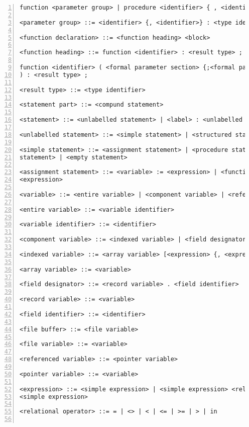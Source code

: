 \begin{Verbatim}[numbers=left]
function <parameter group> | procedure <identifier> { , <identifier>}

<parameter group> ::= <identifier> {, <identifier>} : <type identifier>

<function declaration> ::= <function heading> <block>

<function heading> ::= function <identifier> : <result type> ; |

function <identifier> ( <formal parameter section> {;<formal parameter section>}
) : <result type> ;

<result type> ::= <type identifier>

<statement part> ::= <compund statement>

<statement> ::= <unlabelled statement> | <label> : <unlabelled statement>

<unlabelled statement> ::= <simple statement> | <structured statement>

<simple statement> ::= <assignment statement> | <procedure statement> | <go to
statement> | <empty statement>

<assignment statement> ::= <variable> := <expression> | <function identifier> :=
<expression>

<variable> ::= <entire variable> | <component variable> | <referenced variable>

<entire variable> ::= <variable identifier>

<variable identifier> ::= <identifier>

<component variable> ::= <indexed variable> | <field designator> | <file buffer>

<indexed variable> ::= <array variable> [<expression> {, <expression>}]

<array variable> ::= <variable>

<field designator> ::= <record variable> . <field identifier>

<record variable> ::= <variable>

<field identifier> ::= <identifier>

<file buffer> ::= <file variable>

<file variable> ::= <variable>

<referenced variable> ::= <pointer variable>

<pointer variable> ::= <variable>

<expression> ::= <simple expression> | <simple expression> <relational operator>
<simple expression>

<relational operator> ::= = | <> | < | <= | >= | > | in


\end{Verbatim}
